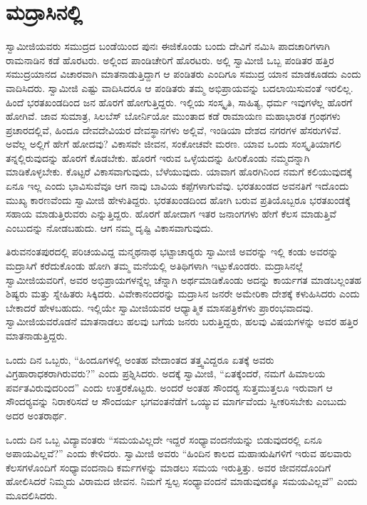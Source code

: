
\chapter{ಮದ್ರಾಸಿನಲ್ಲಿ }

ಸ್ವಾಮೀಜಿಯವರು ಸಮುದ್ರದ ಬಂಡೆಯಿಂದ ಪುನಃ ಈಜಿಕೊಂಡು ಬಂದು ದೇವಿಗೆ ನಮಿಸಿ ಪಾದಚಾರಿಗಳಾಗಿ ರಾಮನಾಡಿನ ಕಡೆ ಹೊರಟರು. ಅಲ್ಲಿಂದ ಪಾಂಡಿಚೇರಿಗೆ ಹೊರಟರು. ಅಲ್ಲಿ ಸ್ವಾಮೀಜಿ ಒಬ್ಬ ಪಂಡಿತರ ಹತ್ತಿರ ಸಮುದ್ರಯಾನದ ವಿಚಾರವಾಗಿ ಮಾತನಾಡುತ್ತಿದ್ದಾಗ ಆ ಪಂಡಿತರು ಎಂದಿಗೂ ಸಮುದ್ರ ಯಾನ ಮಾಡಕೂಡದು ಎಂದು ವಾದಿಸಿದರು. ಸ್ವಾಮೀಜಿ ಎಷ್ಟು ವಾದಿಸಿದರೂ ಆ ಪಂಡಿತರು ತಮ್ಮ ಅಭಿಪ್ರಾಯವನ್ನು ಬದಲಾಯಿಸುವಂತೆ ಇರಲಿಲ್ಲ. ಹಿಂದೆ ಭರತಖಂಡದಿಂದ ಜನ ಹೊರಗೆ ಹೋಗುತ್ತಿದ್ದರು. ಇಲ್ಲಿಯ ಸಂಸ್ಕೃತಿ, ಸಾಹಿತ್ಯ, ಧರ್ಮ ಇವುಗಳೆಲ್ಲ ಹೊರಗೆ ಹೋಗಿವೆ. ಜಾವ ಸುಮಾತ್ರ, ಸಿಲಬೆಸ್ ಬೋರ್ನಿಯೋ ಮುಂತಾದ ಕಡೆ ರಾಮಾಯಣ ಮಹಾಭಾರತ ಗ್ರಂಥಗಳು ಪ್ರಚಾರದಲ್ಲಿವೆ, ಹಿಂದೂ ದೇವದೇವಿಯರ ದೇವಸ್ಥಾನಗಳು ಅಲ್ಲಿವೆ, ಇಂಡಿಯಾ ದೇಶದ ನಗರಗಳ ಹೆಸರುಗಳಿವೆ. ಅವೆಲ್ಲ ಅಲ್ಲಿಗೆ ಹೇಗೆ ಹೋದವು? ವಿಕಾಸವೇ ಜೀವನ, ಸಂಕೋಚವೇ ಮರಣ. ಯಾವ ಒಂದು ಸಂಸ್ಕೃತಿಯಾಗಲಿ ತನ್ನಲ್ಲಿರುವುದನ್ನು ಹೊರಗೆ ಕೊಡಬೇಕು. ಹೊರಗೆ ಇರುವ ಒಳ್ಳೆಯದನ್ನು ಹೀರಿಕೊಂಡು ನಮ್ಮದನ್ನಾಗಿ ಮಾಡಿಕೊಳ್ಳಬೇಕು. ಕೊಟ್ಟರೆ ವಿಕಾಸವಾಗುವುದು, ಬೆಳೆಯುವುದು. ಯಾವಾಗ ಹೊರಗಿನಿಂದ ನಮಗೆ ಕಲಿಯುವುದಕ್ಕೆ ಏನೂ ಇಲ್ಲ ಎಂದು ಭಾವಿಸುವೆವೂ ಆಗ ನಾವು ಬಾವಿಯ ಕಪ್ಪೆಗಳಾಗುವೆವು. ಭರತಖಂಡದ ಅವನತಿಗೆ ಇದೊಂದು ಮುಖ್ಯ ಕಾರಣವೆಂದು ಸ್ವಾಮೀಜಿ ಹೇಳುತಿದ್ದರು. ಭರತಖಂಡದಿಂದ ಹೋಗಿ ಬರುವ ಪ್ರತಿಯೊಬ್ಬರೂ ಭರತಖಂಡಕ್ಕೆ ಸಹಾಯ ಮಾಡುತ್ತಿರುವರು ಎನ್ನುತ್ತಿದ್ದರು. ಹೊರಗೆ ಹೋದಾಗ ಇತರ ಜನಾಂಗಗಳು ಹೇಗೆ ಕೆಲಸ ಮಾಡುತ್ತಿವೆ ಎಂಬುದನ್ನು ನೋಡಬಹುದು. ಆಗ ನಮ್ಮ ದೃಷ್ಟಿ ವಿಕಾಸವಾಗುವುದು. 

 ತಿರುವನಂತಪುರದಲ್ಲಿ ಪರಿಚಯವಿದ್ದ ಮನ್ಮಥನಾಥ ಭಟ್ಟಾಚಾರ‍್ಯರು ಸ್ವಾಮೀಜಿ ಅವರನ್ನು ಇಲ್ಲಿ ಕಂಡು ಅವರನ್ನು ಮದ್ರಾಸಿಗೆ ಕರೆದುಕೊಂಡು ಹೋಗಿ ತಮ್ಮ ಮನೆಯಲ್ಲಿ ಅತಿಥಿಗಳಾಗಿ ಇಟ್ಟುಕೊಂಡರು. ಮದ್ರಾಸಿನಲ್ಲೆ ಸ್ವಾಮೀಜಿಯವರಿಗೆ, ಅವರ ಅಭಿಪ್ರಾಯಗಳನ್ನೆಲ್ಲ ಚೆನ್ನಾಗಿ ಅರ್ಥಮಾಡಿಕೊಂಡು ಅದನ್ನು ಕಾರ್ಯಗತ ಮಾಡಬಲ್ಲಂತಹ ಶಿಷ್ಯರು ಮತ್ತು ಸ್ನೇಹಿತರು ಸಿಕ್ಕಿದರು. ವಿವೇಕಾನಂದರನ್ನು ಮದ್ರಾಸಿನ ಜನರೇ ಅಮೇರಿಕಾ ದೇಶಕ್ಕೆ ಕಳುಹಿಸಿದರು ಎಂದು ಬೇಕಾದರೆ ಹೇಳಬಹುದು. ಇಲ್ಲಿಯೇ ಸ್ವಾಮೀಜಿಯವರ ಆಧ್ಯಾತ್ಮಿಕ ಮಾಸಪತ್ರಿಕೆಗಳು ಪ್ರಾರಂಭವಾದವು. ಸ್ವಾಮೀಜಿಯವರೊಡನೆ ಮಾತನಾಡಲು ಹಲವು ಬಗೆಯ ಜನರು ಬರುತ್ತಿದ್ದರು, ಹಲವು ವಿಷಯಗಳನ್ನು ಅವರ ಹತ್ತಿರ ಮಾತನಾಡುತ್ತಿದ್ದರು. 

 ಒಂದು ದಿನ ಒಬ್ಬರು, “ಹಿಂದೂಗಳಲ್ಲಿ ಅಂತಹ ವೇದಾಂತದ ತತ್ತ್ವವಿದ್ದರೂ ಏತಕ್ಕೆ ಅವರು ವಿಗ್ರಹಾರಾಧಕರಾಗಿರುವರು?” ಎಂದು ಪ್ರಶ್ನಿಸಿದರು. ಅದಕ್ಕೆ ಸ್ವಾಮೀಜಿ, “ಏತಕ್ಕೆಂದರೆ, ನಮಗೆ ಹಿಮಾಲಯ ಪರ್ವತವಿರುವುದರಿಂದ” ಎಂದು ಉತ್ತರಕೊಟ್ಟರು. ಅಂದರೆ ಅಂತಹ ಸೌಂದರ‍್ಯ ಸುತ್ತಮುತ್ತಲೂ ಇರುವಾಗ ಆ ಸೌಂದರ‍್ಯವನ್ನು ನಿರಾಕರಿಸದೆ ಆ ಸೌಂದರ್ಯ ಭಗವಂತನೆಡೆಗೆ ಒಯ್ಯುವ ಮಾರ್ಗವೆಂದು ಸ್ವೀಕರಿಸಬೇಕು ಎಂಬುದು ಅದರ ಅಂತರಾರ್ಥ. 

 ಒಂದು ದಿನ ಒಬ್ಬ ವಿದ್ಯಾವಂತರು “ಸಮಯವಿಲ್ಲದೇ ಇದ್ದರೆ ಸಂಧ್ಯಾವಂದನೆಯನ್ನು ಬಿಡುವುದರಲ್ಲಿ ಏನೂ ಅಪಾಯವಿಲ್ಲವೆ?” ಎಂದು ಕೇಳಿದರು. ಸ್ವಾಮೀಜಿ ಅವರು “ಹಿಂದಿನ ಕಾಲದ ಮಹಾಋಷಿಗಳಿಗೆ ಇರುವ ಹಲವಾರು ಕೆಲಸಗಳೊಂದಿಗೆ ಸಂಧ್ಯಾವಂದನಾದಿ ಕರ್ಮಗಳನ್ನು ಮಾಡಲು ಸಮಯ ಇರುತ್ತಿತ್ತು. ಅವರ ಜೀವನದೊಂದಿಗೆ ಹೋಲಿಸಿದರೆ ನಿಮ್ಮದು ವಿರಾಮದ ಜೀವನ. ನಿಮಗೆ ಸ್ವಲ್ಪ ಸಂಧ್ಯಾವಂದನೆ ಮಾಡುವುದಕ್ಕೂ ಸಮಯವಿಲ್ಲವೆ” ಎಂದು ಮೂದಲಿಸಿದರು. 

